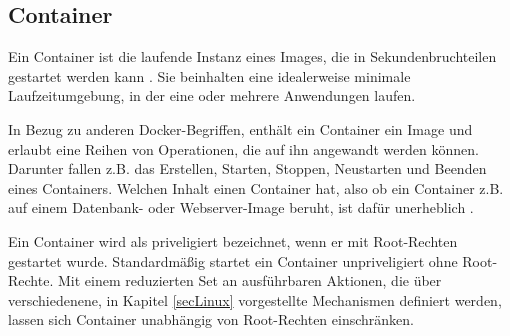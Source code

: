 \documentclass[../main.tex]{subfiles}
\begin{document}
    \subsection{Container}
		\label{dockerContainer}
			Ein Container ist die laufende Instanz eines Images, die in Sekundenbruchteilen gestartet werden kann \cite[S.1]{dockerIntroIEEE}. Sie beinhalten eine idealerweise minimale Laufzeitumgebung, in der eine oder mehrere Anwendungen laufen.

      In Bezug zu anderen Docker-Begriffen, enthält ein Container ein Image und erlaubt eine Reihen von Operationen, die auf ihn angewandt werden können. Darunter fallen z.B. das Erstellen, Starten, Stoppen, Neustarten und Beenden eines Containers. Welchen Inhalt einen Container hat, also ob ein Container z.B. auf einem Datenbank- oder Webserver-Image beruht, ist dafür unerheblich \cite[S.12]{dockerBook}\cite[S.2]{dockerLXCKub}.

      Ein Container wird als priveligiert bezeichnet, wenn er mit Root-Rechten gestartet wurde. Standardmäßig startet ein Container unpriveligiert ohne Root-Rechte. Mit einem reduzierten Set an ausführbaren Aktionen, die über verschiedenene, in Kapitel \ref{secLinux} vorgestellte Mechanismen definiert werden, lassen sich Container unabhängig von Root-Rechten einschränken.


\end{document}
